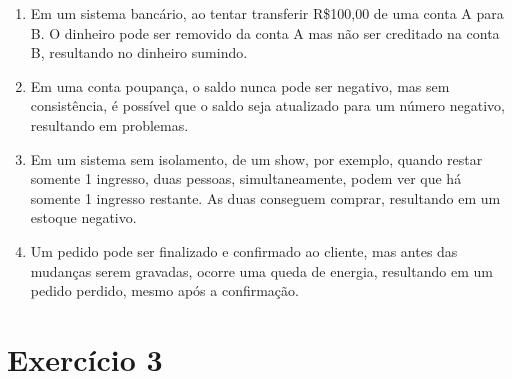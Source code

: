 \documentclass{article}
\begin{document}
\begin{enumerate}[label=\alph*)]

    \item Em um sistema bancário, ao tentar transferir R\$100,00 de uma conta A para B. O dinheiro pode ser removido da conta A mas não ser creditado na conta B, resultando no dinheiro sumindo.

    \item Em uma conta poupança, o saldo nunca pode ser negativo, mas sem consistência, é possível que o saldo seja atualizado para um número negativo, resultando em problemas.

    \item Em um sistema sem isolamento, de um show, por exemplo, quando restar somente 1 ingresso, duas pessoas, simultaneamente, podem ver que há somente 1 ingresso restante. As duas conseguem comprar, resultando em um estoque negativo.

    \item Um pedido pode ser finalizado e confirmado ao cliente, mas antes das mudanças serem gravadas, ocorre uma queda de energia, resultando em um pedido perdido, mesmo após a confirmação.

\end{enumerate}

\section*{Exercício 3}
\end{document}

